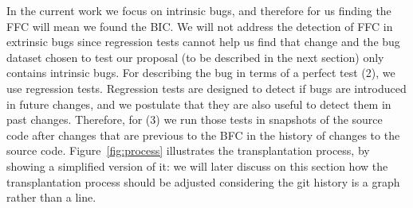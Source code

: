 In the current work we focus on intrinsic bugs, and therefore for us finding the FFC will mean we found the BIC.
We will not address the detection of FFC in extrinsic bugs since regression tests cannot help us find that change and the bug dataset chosen to test our proposal (to be described in the next section) only contains intrinsic bugs.
For describing the bug in terms of a perfect test (2), we use regression tests. Regression tests are designed to detect if bugs are introduced in future changes, and we postulate that they are also useful to detect them in past changes.
Therefore, for (3) we run those tests in snapshots of the source code after changes that are previous to the BFC  in the history of changes to the source code. 
Figure~\ref{fig:process} illustrates the transplantation process, by showing a simplified version of it: we will later discuss on this section how the transplantation process should be adjusted considering the git history is a graph rather than a line.

